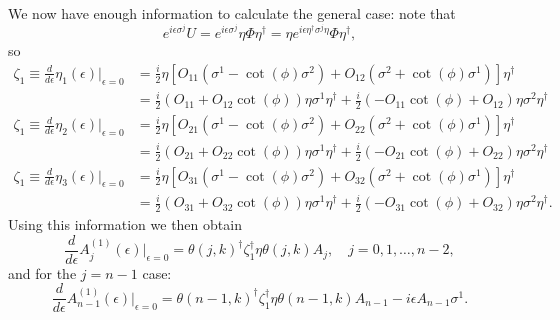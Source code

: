 \documentclass[12pt]{amsart}
\theoremstyle{definition}
\theoremstyle{remark}
\numberwithin{equation}{section}
\begin{document}
We now have enough information to calculate the general case: note that
\begin{equation}
	e^{i\epsilon \sigma^j}U = e^{i\epsilon \sigma^j}\eta \Phi \eta^\dag = \eta e^{i\epsilon \eta^\dag \sigma^j\eta} \Phi \eta^\dag,
\end{equation}
so 
\begin{equation}
	\begin{split}
	\zeta_1 \equiv \frac{d}{d\epsilon} \eta_1(\epsilon)\bigg|_{\epsilon =0} &= \frac{i}{2}\eta \left[O_{11}(\sigma^1 - \cot(\phi)\sigma^2) + O_{12}(\sigma^2 +\cot(\phi)\sigma^1) \right] \eta^\dag \\
	&= \frac{i}{2} (O_{11} + O_{12}\cot(\phi))\eta\sigma^1 \eta^\dag  + \frac{i}{2}(-O_{11} \cot(\phi) + O_{12})\eta\sigma^2 \eta^\dag  \\
	\zeta_1 \equiv\frac{d}{d\epsilon} \eta_2(\epsilon)\bigg|_{\epsilon =0} &= \frac{i}{2}\eta \left[O_{21}(\sigma^1 - \cot(\phi)\sigma^2) + O_{22}(\sigma^2 +\cot(\phi)\sigma^1) \right] \eta^\dag \\
	&= \frac{i}{2} (O_{21} + O_{22}\cot(\phi))\eta\sigma^1 \eta^\dag  + \frac{i}{2}(-O_{21} \cot(\phi) + O_{22})\eta\sigma^2 \eta^\dag \\
	\zeta_1 \equiv\frac{d}{d\epsilon} \eta_3(\epsilon)\bigg|_{\epsilon =0} &= \frac{i}{2}\eta \left[O_{31}(\sigma^1 - \cot(\phi)\sigma^2) + O_{32}(\sigma^2 +	\cot(\phi)\sigma^1) \right] \eta^\dag \\
	&= \frac{i}{2} (O_{31} + O_{32}\cot(\phi))\eta\sigma^1 \eta^\dag  + \frac{i}{2}(-O_{31} \cot(\phi) + O_{32})\eta\sigma^2 \eta^\dag. 
	\end{split}
\end{equation}
Using this information we then obtain
\begin{equation}
	\frac{d}{d\epsilon} A_j^{(1)}(\epsilon)\bigg|_{\epsilon =0} = \theta(j,k)^\dag  \zeta_1^\dag\eta \theta(j,k) A_j, \quad j = 0, 1, \ldots, n-2,
\end{equation}
and for the $j=n-1$ case:
\begin{equation}
	\frac{d}{d\epsilon} A_{n-1}^{(1)}(\epsilon)\bigg|_{\epsilon =0} = \theta(n-1,k)^\dag  \zeta_1^\dag\eta \theta(n-1,k) A_{n-1}- i\epsilon A_{n-1} \sigma^1.
\end{equation}
\end{document}
